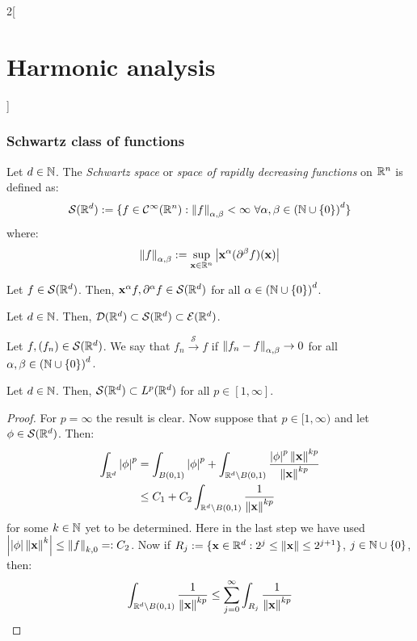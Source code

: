 \documentclass[../../../main_math.tex]{subfiles}
\begin{document}
\begin{multicols}{2}[\section{Harmonic analysis}]
  \subsubsection{Schwartz class of functions}
  \begin{definition}
    Let $d\in\mathbb{N}$. The \emph{Schwartz space} or \emph{space of rapidly decreasing functions} on $\mathbb{R}^n$ is defined as:
    $$
      \mathcal{S}(\RR^d):=\{f\in \mathcal{C}^\infty(\RR^n):\norm{f}_{\alpha,\beta}<\infty\ \forall\alpha,\beta\in{(\NN\cup\{0\})}^d\}
    $$
    where:
    $$
      \left\|f\right\|_{\alpha,\beta}:=\sup_{\boldsymbol{\mathrm{x}}\in\mathbb{R}^n}\abs{\boldsymbol{\mathrm{x}}^\alpha (\partial^\beta f)(\boldsymbol{\mathrm{x}})}
    $$
  \end{definition}
  \begin{lemma}
    Let $f\in \mathcal{S}(\mathbb{R}^d)$. Then, ${\boldsymbol{\mathrm{x}}}^\alpha f,\partial^\alpha f\in \mathcal{S}(\mathbb{R}^d)$ for all $\alpha\in{(\ensuremath{\mathbb{N}}\cup\{0\})}^d$.
  \end{lemma}
  \begin{lemma}
    Let $d\in\mathbb{N}$. Then, $\mathcal{D}(\mathbb{R}^d)\subset\mathcal{S}(\mathbb{R}^d)\subset \mathcal{E}(\mathbb{R}^d)$.
  \end{lemma}
  \begin{definition}
    Let $f,(f_n)\in \mathcal{S}(\mathbb{R}^d)$. We say that $f_n\overset{\mathcal{S}}{\longrightarrow}f$ if $\left\|f_n-f\right\|_{\alpha,\beta}\to 0$ for all $\alpha,\beta\in{(\ensuremath{\mathbb{N}}\cup\{0\})}^d$.
  \end{definition}
  \begin{proposition}
    Let $d\in\mathbb{N}$. Then, $\mathcal{S}(\mathbb{R}^d)\subset L^p(\mathbb{R}^d)$ for all $p\in[1,\infty]$.
  \end{proposition}
  \begin{proof}
    For $p=\infty$ the result is clear. Now suppose that $p\in[1,\infty)$ and let $\phi\in \mathcal{S}(\mathbb{R}^d)$. Then:
    \begin{align*}
      \int_{\mathbb{R}^d}\abs{\phi}^p & = \int_{B(0,1)}\abs{\phi}^p+\int_{\mathbb{R}^d\setminus B(0,1)}\frac{\abs{\phi}^p\left\|\boldsymbol{\mathrm{x}}\right\|^{kp}}{\left\|\boldsymbol{\mathrm{x}}\right\|^{kp}} \\
                               & \leq C_1+C_2\int_{\mathbb{R}^d\setminus B(0,1)}\frac{1}{\left\|\boldsymbol{\mathrm{x}}\right\|^{kp}}
    \end{align*}
    for some $k\in \mathbb{N}$ yet to be determined. Here in the last step we have used $\abs{\abs{\phi}\left\|\boldsymbol{\mathrm{x}}\right\|^{k}}\leq \left\|f\right\|_{k,0}=:C_2$. Now if $R_j:=\{\boldsymbol{\mathrm{x}}\in\mathbb{R}^d:2^j\leq \left\|\boldsymbol{\mathrm{x}}\right\|\leq 2^{j+1}\}$, $j\in\mathbb{N}\cup\{0\}$, then:
    \begin{align*}
      \int_{\RR^d\setminus B(0,1)}\frac{1}{\norm{\vf{x}}^{kp}} & \leq \sum_{j=0}^\infty \int_{R_j}\frac{1}{\norm{\vf{x}}^{kp}} \\

\end{align*}
\end{proof}
\end{multicols}
\end{document}
